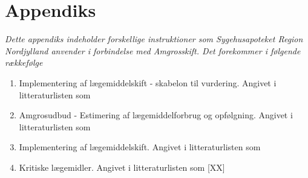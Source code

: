 \chapter{Appendiks} \label{cha:AppD}
\textit{Dette appendiks indeholder forskellige instruktioner som Sygehusapoteket Region Nordjylland anvender i forbindelse med Amgrosskift. Det forekommer i følgende rækkefølge}

\begin{enumerate}
\item Implementering af lægemiddelskift - skabelon til vurdering. Angivet i litteraturlisten som~\citep{Sygehusapoteket2017}
\item Amgrosudbud - Estimering af lægemiddelforbrug og opfølgning. Angivet i litteraturlisten som~\citep{Sygehusapoteket2017a}
\item Implementering af lægemiddelskift. Angivet i litteraturlisten som~\citep{Sygehusapoteket2017b}
\item Kritiske lægemidler. Angivet i litteraturlisten som [XX]
\end{enumerate}




